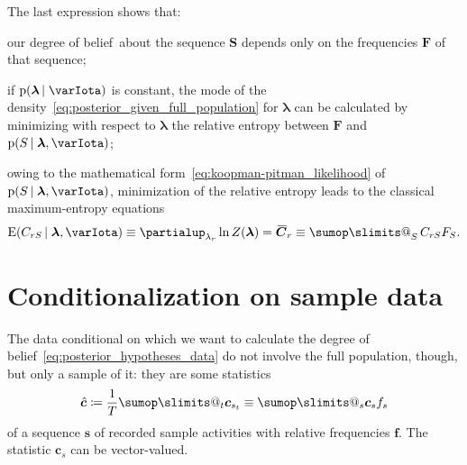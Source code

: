 \documentclass[\ifafour a4paper,12pt,\else a5paper,10pt,\fi%
onecolumn,oneside,article,%
british%
]{memoir}
\makeatletter
\theoremstyle{remark}
\theoremstyle{innote}
\def\sum{\DOTSI\sumop\slimits@}
\newcommand*{\de}{\partialup}%
\newcommand*{\defd}{\coloneqq}
\newcommand*{\pf}{\mathrm{p}}%
\newcommand*{\E}{\mathrm{E}}
\renewcommand*{\|}{\nonscript\,\vert\nonscript\;\mathopen{}}
\newcommand*{\tsum}{\mathop{\textstyle\sum}\nolimits}
\newcommand*{\widebar}[1]{{\mkern1.5mu\skew{2}\overline{\mkern-1.5mu#1\mkern-1.5mu}\mkern 1.5mu}}
\newcommand*{\dob}{degree of belief}
\newcommand*{\yS}{S}
\newcommand*{\ySt}{\bm{\yS}}
\newcommand*{\ys}{s}
\newcommand*{\yst}{\bm{\ys}}
\newcommand*{\yll}{\lambda}
\newcommand*{\yl}{\bm{\lambda}}
\newcommand*{\yc}{\widebar{\bm{C}}}
\newcommand*{\yI}{\varIota}
\newcommand*{\yF}{\bm{F}}
\newcommand*{\yf}{\bm{f}}
\newcommand*{\ycs}{\bm{c}}
\newcommand*{\yccs}{\Hat{\bm{c}}}
\makeatother
\begin{document}
The last expression shows that:
\begin{enumerate*}[label=(\alph*),mode=unboxed]
\item our \dob\ about the sequence $\ySt$ depends only on the frequencies
  $\yF$ of that sequence;
\item if $\pf(\yl \| \yI)$ is constant, the mode of the
  density~\eqref{eq:posterior_given_full_population} for $\yl$ can be
  calculated by minimizing with respect to $\yl$ the relative entropy
  between $\yF$ and $\pf(\yS \| \yl, \yI)$;
\item owing to the mathematical form~\eqref{eq:koopman-pitman_likelihood}
  of $\pf(\yS \| \yl, \yI)$, minimization of the relative entropy leads to
  the classical maximum-entropy equations
  \begin{equation}
    \label{eq:standard_maxent_eqns}
    \E(C_{r\yS} \| \yl, \yI) \equiv
        \de_{\yll_{r}}\ln Z(\yl) = \yc_{r} \equiv \tsum_{\yS} C_{r\yS} F_{\yS}.
  \end{equation}
\end{enumerate*}

\section{Conditionalization on sample data}
\label{sec:sample_data}


The data conditional on which we want to calculate the
\dob~\eqref{eq:posterior_hypotheses_data} do not involve the full
population, though, but only a sample of it: they are some statistics
\begin{equation}
  \label{eq:def_sample_statistics}
  \yccs \defd \frac{1}{T}\sum_{t} \ycs_{\ys_{t}} \equiv
  \sum_{\ys} \ycs_{\ys} f_{\ys}
\end{equation}
of a sequence $\yst$ of recorded sample activities with relative
frequencies $\yf$. The statistic $\ycs_{\ys}$ can be vector-valued.
\end{document}
